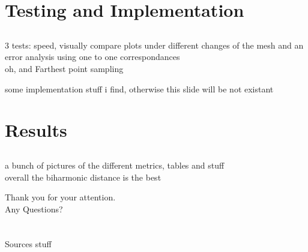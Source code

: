 \documentclass[]{beamer}
\begin{document}
\section{Testing and Implementation}
\subsection*{}
	\begin{frame}
		3 tests: speed, visually compare plots under different changes of the mesh
		and an error analysis using one to one correspondances\\
		oh, and Farthest point sampling
	\end{frame}

	\begin{frame}
		some implementation stuff i find, otherwise this slide will be not existant
	\end{frame}

\section{Results}
\subsection*{}
	\begin{frame}
		a bunch of pictures of the different metrics, tables and stuff\\
		overall the biharmonic distance is the best
	\end{frame}


	\begin{frame}
		\centering \large
		Thank you for your attention.\\
		Any Questions?
	\end{frame}

\section*{} %
\appendix
	\begin{frame}{Sources}
		stuff
	\end{frame}
\end{document}
